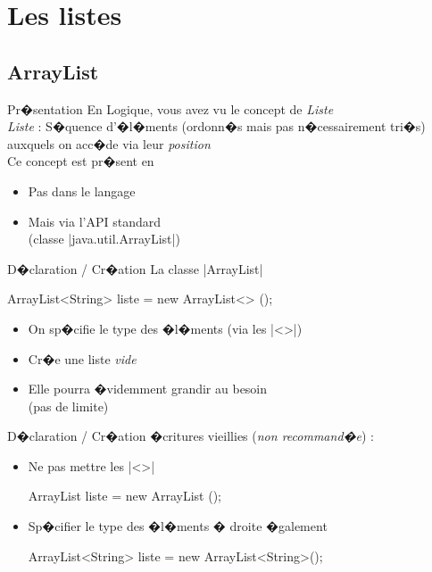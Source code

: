 
\section{Les listes}

\leconwithtoc

\subsection{ArrayList}

\begin{frame}{Pr�sentation}
En Logique, vous avez vu le concept de \textit{Liste}
\\\bigskip
\emph{Liste} : S�quence d'�l�ments (ordonn�s mais pas n�cessairement tri�s) auxquels on acc�de via leur \emph{position}
\\\bigskip
Ce concept est pr�sent en 
\begin{itemize}
  \item Pas dans le langage
  \item Mais via l'API standard \\(classe \java|java.util.ArrayList|)
\end{itemize}
\end{frame}

\begin{frame}[fragile]{D�claration / Cr�ation}
La classe \java|ArrayList|
\medskip
\begin{Java}
  ArrayList<String> liste = new ArrayList<> ();
\end{Java}
\medskip
\begin{itemize}
\item On sp�cifie le type des �l�ments (via les \java|<>|)
\item Cr�e une liste \emph{vide}
\item Elle pourra �videmment grandir au besoin \\(pas de limite)
\end{itemize}
\end{frame}

\begin{frame}[fragile]{D�claration / Cr�ation}
�critures vieillies (\emph{non recommand�e}) : 
\begin{itemize}
\item Ne pas mettre les \java|<>|
\begin{Java}
  ArrayList liste = new ArrayList ();
\end{Java}
\item Sp�cifier le type des �l�ments � droite �galement
\begin{Java}
  ArrayList<String> liste = new ArrayList<String>();
\end{Java}
\end{itemize}
\end{frame}

